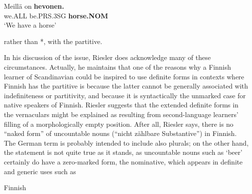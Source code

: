 
 \ea\label{}
\gll Meillä  on  \textbf{hevonen.} \\


we.ALL  be.PRS.3SG  \textbf{horse.NOM} \\

\glt ‘We have a horse’

\z

rather than *, with the partitive.


In his discussion of the issue, Riesler does acknowledge many of these circumstances. Actually, he maintains that one of the reasons why a Finnish learner of Scandinavian could be inspired to use definite forms in contexts where Finnish has the partitive is because the latter cannot be generally associated with indefiniteness or partitivity, and because it is syntactically the unmarked case for native speakers of Finnish. Riesler suggests that the extended definite forms in the vernaculars might be explained as resulting from second-language learners’ filling of a morphologically empty position. After all, Riesler says, there is no “naked form” of uncountable nouns (“nicht zählbare Substantive”) in Finnish. The German term is probably intended to include also plurals; on the other hand, the statement is not quite true as it stands, as uncountable nouns such as  ‘beer’ certainly do have a zero-marked form, the nominative, which appears in definite and generic uses such as


\item 

Finnish



\item 

